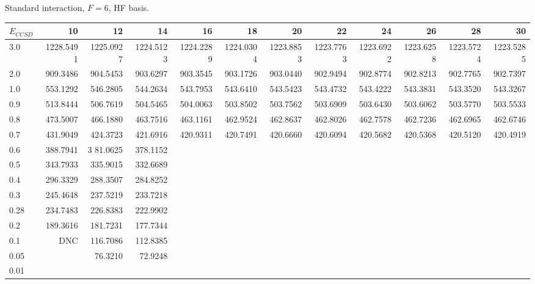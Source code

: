 \begin{landscape}
\begin{table}
\begin{small}
\begin{center}
Standard interaction, $F=6$, HF basis.\\
\begin{tabular}{l|rrrrrrrrrrr}
\hline 
$E_{CCSD}$ & 10 & 12 & 14 & 16 & 18 & 20 & 22 & 24 & 26 & 28 & 30 \\
\hline \hline
3.0 & 1228.5491 & 1225.0927 & 1224.5123 & 1224.2289 & 1224.0304 & 1223.8853 & 1223.7763 & 1223.6922 & 1223.6258 & 1223.5724 & 1223.5285 \\ 
2.0 &  909.3486 &  904.5453 &  903.6297 &  903.3545 &  903.1726 &  903.0440 &  902.9494 &  902.8774 &  902.8213 &  902.7765 &  902.7397 \\ 
1.0 &  553.1292 &  546.2805 &  544.2634 &  543.7953 &  543.6410 &  543.5423 &  543.4732 &  543.4222 &  543.3831 &  543.3520 &  543.3267 \\ 
0.9 &  513.8444 &  506.7619 &  504.5465 &  504.0063 &  503.8502 &  503.7562 &  503.6909 &  503.6430 &  503.6062 &  503.5770 &  503.5533 \\ 
0.8 &  473.5007 &  466.1880 &  463.7516 &  463.1161 &  462.9524 &  462.8637 &  462.8026 &  462.7578 &  462.7236 &  462.6965 &  462.6746 \\ 
0.7 &  431.9049 &  424.3723 &  421.6916 &  420.9311 &  420.7491 &  420.6660 &  420.6094 &  420.5682 &  420.5368 &  420.5120 &  420.4919 \\ 
0.6 &  388.7941 & 3 81.0625 &  378.1152 & \\ 
0.5 & 343.7933 & 335.9015 & 332.6689  \\ 
0.4 & 296.3329 & 288.3507 & 284.8252  \\ 
0.3 & 245.4648 & 237.5219 & 233.7218  \\ 
0.28 & 234.7483 & 226.8383 & 222.9902  \\ 
0.2 & 189.3616 & 181.7231 & 177.7344  \\ 
0.1 & DNC & 116.7086 & 112.8385  \\ 
0.05 &        & 76.3210 & 72.9248  \\ 
0.01 &        &   \\ 
\hline \hline
\end{tabular}
\end{center}
\end{small}
\end{table}
\end{landscape}



